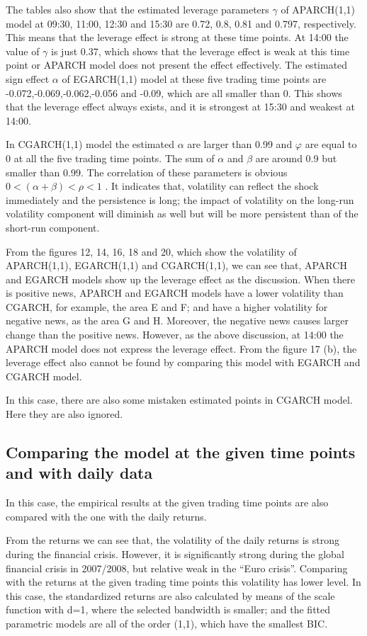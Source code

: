 The tables also show that the estimated leverage parameters $\gamma$  of APARCH(1,1) model at 09:30, 11:00, 12:30 and 15:30 are 0.72, 0.8, 0.81 and 0.797, respectively. This means that the leverage effect is strong at these time points. At 14:00 the value of $\gamma$  is just 0.37, which shows that the leverage effect is weak at this time point or APARCH model does not present the effect effectively. The estimated sign effect $\alpha$  of EGARCH(1,1) model at these five trading time points are -0.072,-0.069,-0.062,-0.056 and -0.09, which are all smaller than 0. This shows that the leverage effect always exists, and it is strongest at 15:30 and weakest at 14:00.

In CGARCH(1,1) model the estimated $\alpha$  are larger than 0.99 and $\varphi$  are equal to 0 at all the five trading time points. The sum of  $\alpha$  and $\beta$ are around 0.9 but smaller than 0.99. The correlation of these parameters is obvious  $0 < (\alpha + \beta) < \rho <1$ . It indicates that, volatility can reflect the shock immediately and the persistence is long; the impact of volatility on the long-run volatility component will diminish as well but will be more persistent than of the short-run component.

From the figures 12, 14, 16, 18 and 20, which show the volatility of APARCH(1,1), EGARCH(1,1) and CGARCH(1,1), we can see that, APARCH and EGARCH models show up the leverage effect as the discussion. When there is positive news, APARCH and EGARCH models have a lower volatility than CGARCH, for example, the area E and F; and have a higher volatility for negative news, as the area G and H. Moreover, the negative news causes larger change than the positive news. However, as the above discussion, at 14:00 the APARCH model does not express the leverage effect. From the figure 17 (b), the leverage effect also cannot be found by comparing this model with EGARCH and CGARCH model.

In this case, there are also some mistaken estimated points in CGARCH model. Here they are also ignored.

\subsection{Comparing the model at the given time points and with daily data}

In this case, the empirical results at the given trading time points are also compared with the one with the daily returns.

From the returns we can see that, the volatility of the daily returns is strong during the financial crisis. However, it is significantly strong during the global financial crisis in 2007/2008, but relative weak in the ``Euro crisis''. Comparing with the returns at the given trading time points this volatility has lower level. In this case, the standardized returns are also calculated by means of the scale function with d=1, where the selected bandwidth is smaller; and the fitted parametric models are all of the order (1,1), which have the smallest BIC.

